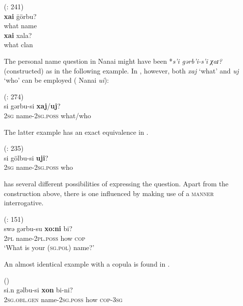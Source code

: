 \documentclass[output=paper,colorlinks,citecolor=brown]{langscibook}
\begin{document}
\ea
    \label{example4.96}
     (\citealt{Schmidt1928b}: 241)\\
    \ea
    \gll \textbf{xai}		ḡörbu?\\
    what		name\\

    \ex
    \gll \textbf{xai}		xala?\\
    	what		clan\\
    \z
\z

The personal name question in  Nanai might have been *\textit{s’i gərb’i-s’i χaɪ?} (constructed) as in the following  example. In , however, both \textit{xaj} ‘what’ and \textit{uj} ‘who’ can be employed ( Nanai \textit{ui}):

\ea
    \label{example4.97}
     (\citealt{Avrorin1959}: 274)\\
    \gll si		gərbu-si			\textbf{xaj}/\textbf{uj}?\\
    2\textsc{sg}		name-2\textsc{sg.poss}		what/who\\
    \z

\noindent The latter example has an exact equivalence in .

\ea
    \label{example4.98}
     (\citealt{Schmidt1923b}: 235)\\
    \gll si		gölbu-si			\textbf{uji}?\\
    2\textsc{sg}		name-2\textsc{sg.poss}		who\\
    \z

 has several different possibilities of expressing the question. Apart from the construction above, there is one influenced by  making use of a \textsc{manner} interrogative.

\ea
    \label{example4.99}
     (\citealt{KoYurn2011}: 151)\\
    \gll swə		gərbu-su		\textbf{xo:ni}	bi?\\
    2\textsc{pl}		name-2\textsc{pl.poss}		how		\textsc{cop}\\
    \glt ‘What is your (\textsc{sg.pol}) name?’
    \z

\noindent An almost identical example with a copula is found in .

\ea
    \label{example4.100}
     (\citealt[3]{Angina1993})\\
    \gll si.n			gəlbu-si			\textbf{xon}		bi-ni?\\
    2\textsc{sg.obl.gen}	name-2\textsc{sg.poss}		how		\textsc{cop-3sg}\\
    \z
\end{document}
